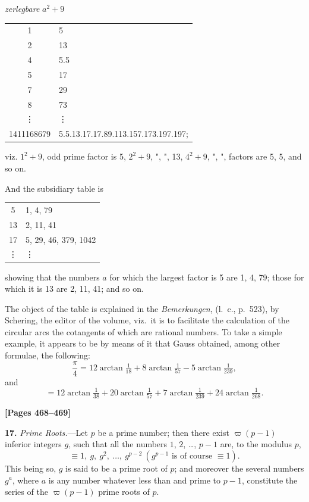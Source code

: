 \documentclass[11pt,a4paper]{book}
\begin{document}
\begin{center}
\textit{zerlegbare} $a^{2}+9$
\end{center}
\begin{center}
\begin{tabular}{c|l}
1 & 5 \\
2 & 13 \\
4 & 5.5 \\
5 & 17 \\
7 & 29 \\
8 & 73 \\
\vdots & \vdots \\
1411168679 & 5.5.13.17.17.89.113.157.173.197.197;
\end{tabular}
\end{center}
viz. $1^{2}+9$, odd prime factor is 5, $2^{2}+9$, ",
", 13, $4^{2}+9$, ",
", factors are 5, 5, and so on.

And the subsidiary table is
\begin{center}
\begin{tabular}{c|l}
5 & 1, 4, 79 \\
13 & 2, 11, 41 \\
17 & 5, 29, 46, 379, 1042 \\
\vdots & \vdots
\end{tabular}
\end{center}
showing that the numbers $a$ for which the largest factor is 5 are 1, 4, 79; those for which it is 13 are 2, 11, 41; and so on.

The object of the table is explained in the \textit{Bemerkungen}, (l.\ c., p.\ 523), by Schering, the editor of the volume, viz.\ it is to facilitate the calculation of the circular arcs the cotangents of which are rational numbers. To take a simple example, it appears to be by means of it that Gauss obtained, among other formulae, the following:
\[\frac{\pi}{4} = 12 \arctan\tfrac{1}{18} + 8 \arctan\tfrac{1}{57} - 5 \arctan\tfrac{1}{239},\]
and
\[= 12 \arctan\tfrac{1}{38} + 20 \arctan\tfrac{1}{57} + 7 \arctan\tfrac{1}{239} + 24 \arctan\tfrac{1}{268}.\]


\newpage
\textbf{[Pages 468--469]}

\textbf{17.} \textit{Prime Roots.}---Let $p$ be a prime number; then there exist $\varpi(p-1)$ inferior integers $g$, such that all the numbers $1$, $2$, \ldots, $p-1$ are, to the modulus $p$,
\[\equiv 1,\ g,\ g^{2},\ \ldots,\ g^{p-2}\ (g^{p-1} \text{ is of course } \equiv 1).\]
This being so, $g$ is said to be a prime root of $p$; and moreover the several numbers $g^{a}$, where $a$ is any number whatever less than and prime to $p-1$, constitute the series of the $\varpi(p-1)$ prime roots of $p$.
\end{document}
